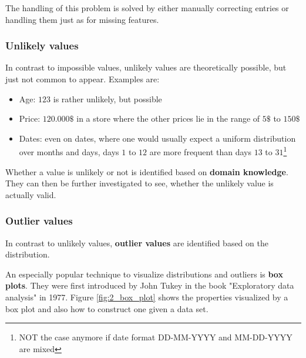 The handling of this problem is solved by either manually correcting entries or handling them just as for missing features.

\subsubsection*{Unlikely values}
In contrast to impossible values, unlikely values are theoretically possible, but just not common to appear. Examples are:
\begin{itemize}
  \item Age: $123$ is rather unlikely, but possible
  \item Price: $120.000\$$ in a store where the other prices lie in the range of $5\$$ to $150\$$
  \item Dates: even on dates, where one would usually expect a uniform distribution over months and days, days $1$ to $12$ are more frequent than days $13$ to $31$\footnote{NOT the case anymore if date format \textcolor{mathblue}{DD-MM-YYYY} and \textcolor{mathblue}{MM-DD-YYYY} are mixed}
\end{itemize}
Whether a value is unlikely or not is identified based on \textbf{domain knowledge}. They can then be further investigated to see, whether the unlikely value is actually valid.


\subsubsection*{Outlier values}
In contrast to unlikely values, \textbf{outlier values} are identified based on the distribution. 

An especially popular technique to visualize distributions and outliers is \textbf{box plots}. They were first introduced by John Tukey in the book "Exploratory data analysis" in 1977. Figure \ref{fig:2_box_plot} shows the properties visualized by a box plot and also how to construct one given a data set. 

